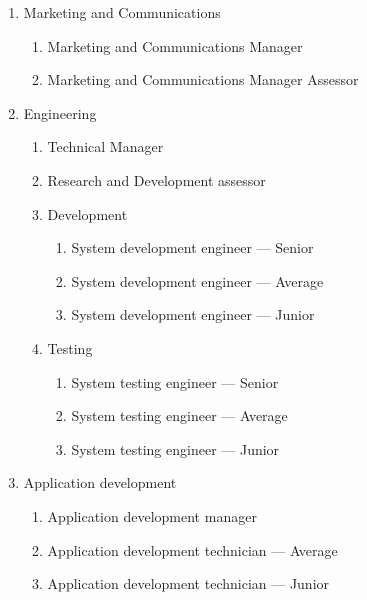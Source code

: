 \begin{enumerate}[label*=\arabic*.]
\begin{enumerate}[label*=\arabic*.]
\begin{enumerate}[label*=\arabic*.]
		\end{enumerate}
		\item Marketing and Communications
		\begin{enumerate}[label*=\arabic*.]
			\item Marketing and Communications Manager
			\item Marketing and Communications Manager Assessor
		\end{enumerate}
		\item Engineering
		\begin{enumerate}[label*=\arabic*.]
			\item Technical Manager
			\item Research and Development assessor
			\item Development
			\begin{enumerate}[label*=\arabic*.]
				\item System development engineer --- Senior
				\item System development engineer --- Average
				\item System development engineer --- Junior
			\end{enumerate}
			\item Testing
			\begin{enumerate}[label*=\arabic*.]
				\item System testing engineer --- Senior
				\item System testing engineer --- Average
				\item System testing engineer --- Junior
			\end{enumerate}
		\end{enumerate}
		\item Application development
		\begin{enumerate}[label*=\arabic*.]
			\item Application development manager
			\item Application development technician --- Average
			\item Application development technician --- Junior
		\end{enumerate}
	\end{enumerate}
	

\end{enumerate}
